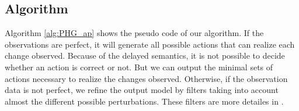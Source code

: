 \subsection{Algorithm}
Algorithm \ref{alg:PHG_ap} shows the pseudo code of our algorithm.
If the observations are perfect, it will generate all possible actions that can realize each change observed.
Because of the delayed semantics, it is not possible to decide whether an action is correct or not.
But we can output the minimal sets of actions necessary to realize the changes observed.
Otherwise, if the observation data is not perfect, we refine the output model by filters taking into account almost the different possible perturbations. These filters are more detailes in .

